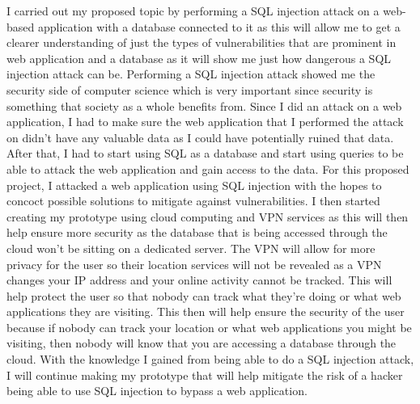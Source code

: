 I carried out my proposed topic by performing a SQL injection attack on a web-based application with a database connected to it as this will allow me to get a clearer understanding of just the types of vulnerabilities that are prominent in web application and a database as it will show me just how dangerous a SQL injection attack can be. Performing a SQL injection attack showed me the security side of computer science which is very important since security is something that society as a whole benefits from. Since I did an attack on a web application, I had to make sure the web application that I performed the attack on didn't have any valuable data as I could have potentially ruined that data. After that, I had to start using SQL as a database and start using queries to be able to attack the web application and gain access to the data. For this proposed project, I attacked a web application using SQL injection with the hopes to concoct possible solutions to mitigate against vulnerabilities. I then started creating my prototype using cloud computing and VPN services as this will then help ensure more security as the database that is being accessed through the cloud won't be sitting on a dedicated server. The VPN will allow for more privacy for the user so their location services will not be revealed as a VPN changes your IP address and your online activity cannot be tracked. This will help protect the user so that nobody can track what they're doing or what web applications they are visiting. This then will help ensure the security of the user because if nobody can track your location or what web applications you might be visiting, then nobody will know that you are accessing a database through the cloud. With the knowledge I gained from being able to do a SQL injection attack, I will continue making my prototype that will help mitigate the risk of a hacker being able to use SQL injection to bypass a web application.
